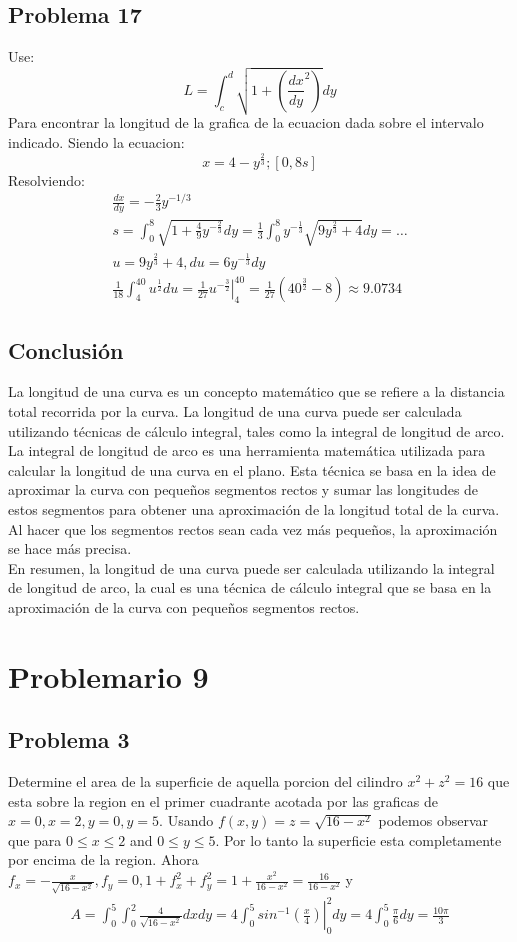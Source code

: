 \documentclass{article}
\begin{document}
\subsection{Problema 17}
Use:
$$
L=\int_{c}^{d}\sqrt{1+\left(\frac{dx}{dy}^2\right)}dy
$$
Para encontrar la longitud de la grafica de la ecuacion dada sobre el intervalo indicado.
Siendo la ecuacion:
$$
x = 4-y^{\frac{2}{3}};[0,8s]
$$
Resolviendo:
\begin{align*}
  \frac{dx}{dy}=-\frac{2}{3}y^{-1/3}\\ s = \int_{0}^{8}\sqrt{1+\frac{4}{9}y^{-\frac{2}{3}}}dy = \frac{1}{3}\int_{0}^{8}y^{-\frac{1}{3}}\sqrt{9y^{\frac{2}{3}}+4}dy = \dots \\ u =9y^{\frac{2}{3}}+4, du =6y^{-\frac{1}{3}}dy \\ \frac{1}{18}\int_{4}^{40}u^{\frac{1}{2}} du = \left.\frac{1}{27}u^{-\frac{3}{2}}\right|_4^{40} = \frac{1}{27}(40^{\frac{3}{2}}-8)\approx 9.0734
\end{align*}
\subsection{Conclusión}
La longitud de una curva es un concepto matemático que se refiere a la distancia total recorrida por la curva. La longitud de una curva puede ser calculada utilizando técnicas de cálculo integral, tales como la integral de longitud de arco.
\\
La integral de longitud de arco es una herramienta matemática utilizada para calcular la longitud de una curva en el plano. Esta técnica se basa en la idea de aproximar la curva con pequeños segmentos rectos y sumar las longitudes de estos segmentos para obtener una aproximación de la longitud total de la curva. Al hacer que los segmentos rectos sean cada vez más pequeños, la aproximación se hace más precisa.
\\
En resumen, la longitud de una curva puede ser calculada utilizando la integral de longitud de arco, la cual es una técnica de cálculo integral que se basa en la aproximación de la curva con pequeños segmentos rectos.

\section{Problemario 9}
\subsection{Problema 3}
Determine el area de la superficie de aquella porcion del cilindro $x^2+z^2=16$ que esta sobre la region en el primer cuadrante acotada por las graficas de $x=0, x=2, y=0,y=5$.
Usando $f(x,y)=z=\sqrt{16-x^2}$ podemos observar que para $0\leq x\leq2$ and $0\leq y\leq5$. Por lo tanto la superficie esta completamente por encima de la region. Ahora $f_x = - \frac{x}{\sqrt{16-x^2}}, f_y = 0, 1+f_x^2+f_y^2 = 1+\frac{x^2}{16-x^2}=\frac{16}{16-x^2}$  y 
\begin{align*}
  A =\int_{0}^{5}\int_{0}^{2}\frac{4}{\sqrt{16-x^2}}dxdy = \left.4 \int_{0}^{5}sin^{-1}(\frac{x}{4})\right|_0^2dy=4\int_{0}^{5}\frac{\pi}{6}dy=\frac{10\pi}{3}
\end{align*}
\end{document}
